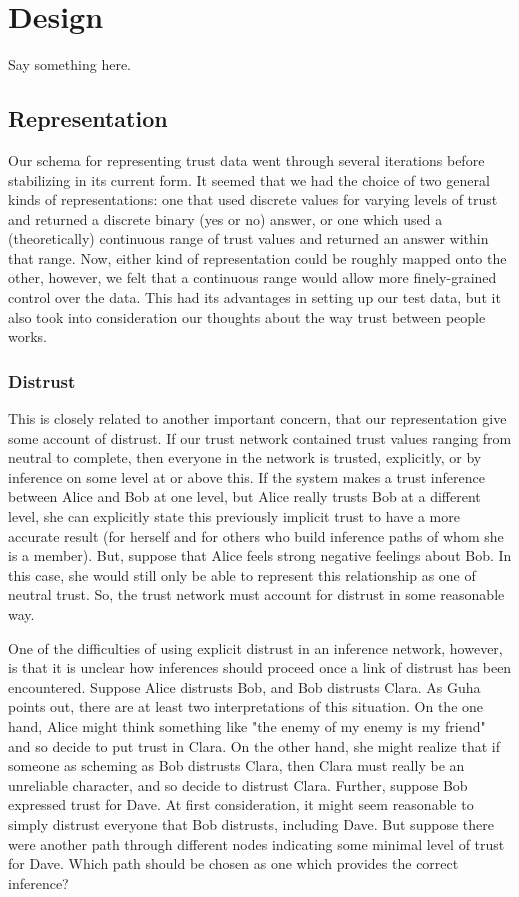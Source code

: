 \documentclass{acm_proc_article-sp}
\begin{document}
\section{Design}
Say something here.

\subsection{Representation}
Our schema for representing trust data went through several iterations before stabilizing in its current form.  It seemed that we had the choice of two general kinds of representations:  one that used discrete values for varying levels of trust and returned a discrete binary (yes or no) answer, or one which used a (theoretically) continuous range of trust values and returned an answer within that range.  Now, either kind of representation could be roughly mapped onto the other, however, we felt that a continuous range would allow more finely-grained control over the data.  This had its advantages in setting up our test data, but it also took into consideration our thoughts about the way trust between people works.  

\subsubsection{Distrust}
This is closely related to another important concern, that our representation give some account of distrust.  If our trust network contained trust values ranging from neutral to complete, then everyone in the network is trusted, explicitly, or by inference on some level at or above this.  If the system makes a trust inference between Alice and Bob at one level, but Alice really trusts Bob at a different level, she can explicitly state this previously implicit trust to have a more accurate result (for herself and for others who build inference paths of whom she is a member).  But, suppose that Alice feels strong negative feelings about Bob.  In this case, she would still only be able to represent this relationship as one of neutral trust.  So, the trust network must account for distrust in some reasonable way.

One of the difficulties of using explicit distrust in an inference network, however, is that it is unclear how inferences should proceed once a link of distrust has been encountered.  Suppose Alice distrusts Bob, and Bob distrusts Clara.  As Guha points out\cite{guha04propagation}, there are at least two interpretations of this situation.  On the one hand, Alice might think something like "the enemy of my enemy is my friend" and so decide to put trust in Clara.  On the other hand, she might realize that if someone as scheming as Bob distrusts Clara, then Clara must really be an unreliable character, and so decide to distrust Clara.  Further, suppose Bob expressed trust for Dave.  At first consideration, it might seem reasonable to simply distrust everyone that Bob distrusts, including Dave.  But suppose there were another path through different nodes indicating some minimal level of trust for Dave.  Which path should be chosen as one which provides the correct inference?
\end{document}
